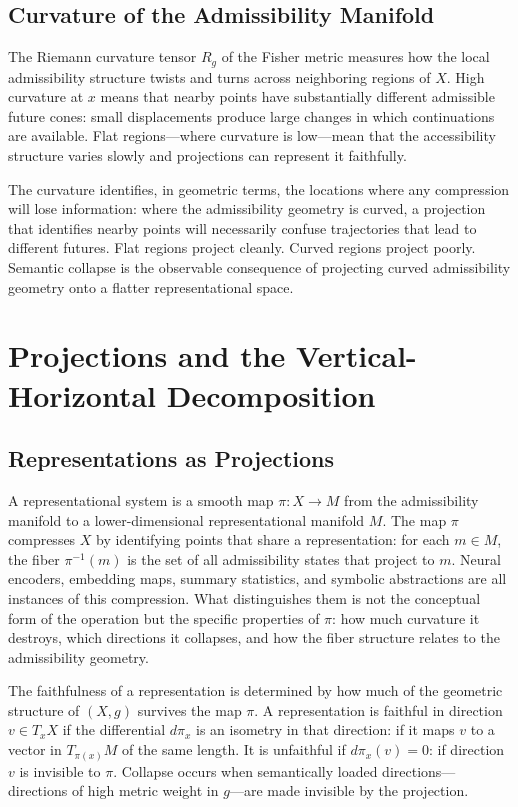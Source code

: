 \documentclass[12pt, oneside]{book}
\theoremstyle{plain-flyxion}
\theoremstyle{definition-flyxion}
\begin{document}
\section{Curvature of the Admissibility Manifold}

The Riemann curvature tensor $R_g$ of the Fisher metric measures how the local
admissibility structure twists and turns across neighboring regions of $X$. High
curvature at $x$ means that nearby points have substantially different admissible future
cones: small displacements produce large changes in which continuations are available.
Flat regions---where curvature is low---mean that the accessibility structure varies
slowly and projections can represent it faithfully.

The curvature identifies, in geometric terms, the locations where any compression will
lose information: where the admissibility geometry is curved, a projection that identifies
nearby points will necessarily confuse trajectories that lead to different futures. Flat
regions project cleanly. Curved regions project poorly. Semantic collapse is the
observable consequence of projecting curved admissibility geometry onto a flatter
representational space.

\chapter{Projections and the Vertical-Horizontal Decomposition}

\section{Representations as Projections}

A representational system is a smooth map $\pi: X\to M$ from the admissibility manifold
to a lower-dimensional representational manifold $M$. The map $\pi$ compresses $X$ by
identifying points that share a representation: for each $m\in M$, the fiber
$\pi^{-1}(m)$ is the set of all admissibility states that project to $m$. Neural
encoders, embedding maps, summary statistics, and symbolic abstractions are all instances
of this compression. What distinguishes them is not the conceptual form of the operation
but the specific properties of $\pi$: how much curvature it destroys, which directions it
collapses, and how the fiber structure relates to the admissibility geometry.

The faithfulness of a representation is determined by how much of the geometric structure
of $(X,g)$ survives the map $\pi$. A representation is faithful in direction $v\in T_xX$
if the differential $d\pi_x$ is an isometry in that direction: if it maps $v$ to a vector
in $T_{\pi(x)}M$ of the same length. It is unfaithful if $d\pi_x(v) = 0$: if direction
$v$ is invisible to $\pi$. Collapse occurs when semantically loaded directions---directions
of high metric weight in $g$---are made invisible by the projection.
\end{document}
